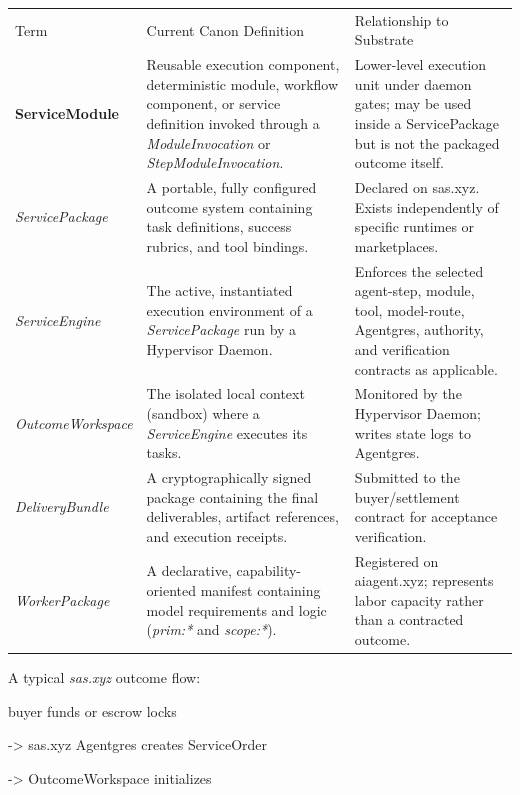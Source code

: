 \documentclass[
  11pt,
]{article}
\begin{document}
\begin{longtable}[]{@{}
  >{\raggedright\arraybackslash}p{}
  >{\raggedright\arraybackslash}p{}
  >{\raggedright\arraybackslash}p{}@{}}
\toprule\noalign{}
& & \\
\midrule\noalign{}
\endhead
\bottomrule\noalign{}
\endlastfoot
Term & Current Canon Definition & Relationship to Substrate \\
\textbf{ServiceModule} & Reusable execution component, deterministic
module, workflow component, or service definition invoked through a
\emph{ModuleInvocation} or \emph{StepModuleInvocation}. & Lower-level
execution unit under daemon gates; may be used inside a ServicePackage
but is not the packaged outcome itself. \\
\emph{ServicePackage} & A portable, fully configured outcome system
containing task definitions, success rubrics, and tool bindings. &
Declared on sas.xyz. Exists independently of specific runtimes or
marketplaces. \\
\emph{ServiceEngine} & The active, instantiated execution environment of
a \emph{ServicePackage} run by a Hypervisor Daemon. & Enforces the selected
agent-step, module, tool, model-route, Agentgres, authority, and verification
contracts as applicable. \\
\emph{OutcomeWorkspace} & The isolated local context (sandbox) where a
\emph{ServiceEngine} executes its tasks. & Monitored by the Hypervisor
Daemon; writes state logs to Agentgres. \\
\emph{DeliveryBundle} & A cryptographically signed package containing
the final deliverables, artifact references, and execution receipts. &
Submitted to the buyer/settlement contract for acceptance
verification. \\
\emph{WorkerPackage} & A declarative, capability-oriented manifest
containing model requirements and logic (\emph{prim:*} and
\emph{scope:*}). & Registered on aiagent.xyz; represents labor capacity
rather than a contracted outcome. \\
\end{longtable}

A typical \emph{sas.xyz} outcome flow:

buyer funds or escrow locks

-\textgreater{} sas.xyz Agentgres creates ServiceOrder

-\textgreater{} OutcomeWorkspace initializes
\end{document}
